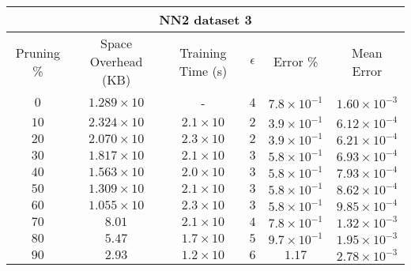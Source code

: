 \begin{adjustwidth}{0cm}{}
\begin{tabular}{cccccc}
\hline
\multicolumn{6}{c}{NN2 dataset 3} \\
\toprule
Pruning \% & Space Overhead (KB) & Training Time (s) & $\epsilon$ & Error \% & Mean Error\\
\midrule
$0$ & $1.289 \times 10$ & - & $4$ & $7.8 \times 10^{-1}$ & $1.60 \times 10^{-3}$\\
$10$ & $2.324 \times 10$ & $2.1 \times 10$ & $2$ & $3.9 \times 10^{-1}$ & $6.12 \times 10^{-4}$\\
$20$ & $2.070 \times 10$ & $2.3 \times 10$ & $2$ & $3.9 \times 10^{-1}$ & $6.21 \times 10^{-4}$\\
$30$ & $1.817 \times 10$ & $2.1 \times 10$ & $3$ & $5.8 \times 10^{-1}$ & $6.93 \times 10^{-4}$\\
$40$ & $1.563 \times 10$ & $2.0 \times 10$ & $3$ & $5.8 \times 10^{-1}$ & $7.93 \times 10^{-4}$\\
$50$ & $1.309 \times 10$ & $2.1 \times 10$ & $3$ & $5.8 \times 10^{-1}$ & $8.62 \times 10^{-4}$\\
$60$ & $1.055 \times 10$ & $2.3 \times 10$ & $3$ & $5.8 \times 10^{-1}$ & $9.85 \times 10^{-4}$\\
$70$ & $8.01$ & $2.1 \times 10$ & $4$ & $7.8 \times 10^{-1}$ & $1.32 \times 10^{-3}$\\
$80$ & $5.47$ & $1.7 \times 10$ & $5$ & $9.7 \times 10^{-1}$ & $1.95 \times 10^{-3}$\\
$90$ & $2.93$ & $1.2 \times 10$ & $6$ & $1.17$ & $2.78 \times 10^{-3}$\\
\bottomrule
\end{tabular}
\end{adjustwidth}

\par\null\par
\par\null\par

